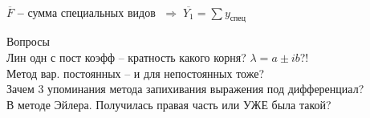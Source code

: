 \documentclass[11pt,a4paper]{article}
\newcommand*\circled[1]{\tikz[baseline=(char.base)]{\node[shape=circle,draw,inner sep=2pt] (char) {#1};}}
\newcommand{\textinfers}{\;\Rightarrow\;}
\newcommand{\bfend}{\textbf{--} }
\newcommand{\mat}[1]{\overline{#1}}
\newcommand{\htext}{0.46\textwidth}
\begin{document}
{\circled{3}\,
\parbox[t][]{\htext}{$\mat{F}$ \bfend сумма специальных видов $\textinfers \mat{Y_1} = \sum y_{\text{спец}}$ %
}\vspace{0.5em}

\vspace{6em}
\small{Вопросы\\
Лин одн с пост коэфф -- кратность какого корня? $\lambda = a\pm ib$?!\\
Метод вар. постоянных -- и для непостоянных тоже?\\
Зачем 3 упоминания метода запихивания выражения под дифференциал?\\
В методе Эйлера. Получилась правая часть или УЖЕ была такой?
}

} %
\end{document}
